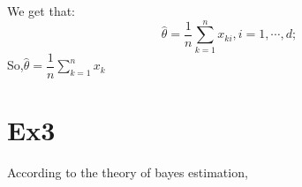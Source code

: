 \documentclass[10pt,a4paper]{article}
\begin{document}
	We get that:
	\begin{equation*}
	\hat{\theta}=\dfrac{1}{n}\sum_{k=1}^{n}x_{ki},i=1,\cdots,d;
	\end{equation*}
	So,$\hat{\theta}=\dfrac{1}{n}\sum_{k=1}^{n}x_k$
	\section{Ex3}
	According to the theory of bayes estimation,
	
\end{document}
